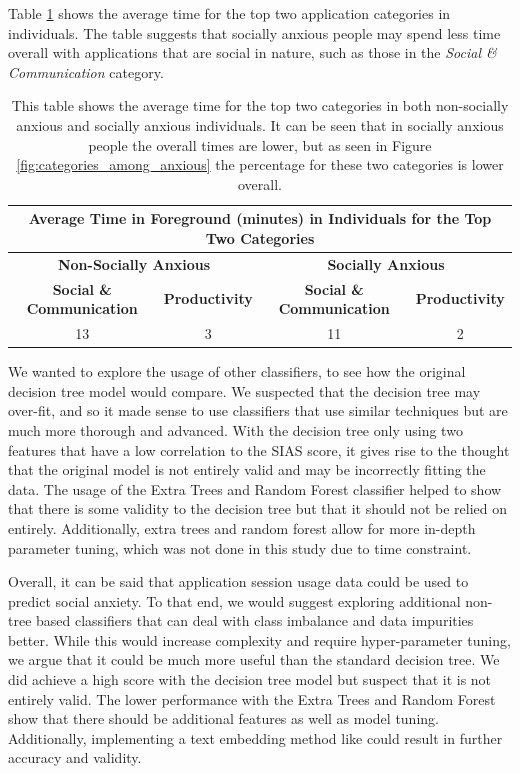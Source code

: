 \documentclass{l4proj}
\begin{document}
Table \ref{table:session_times_dtree} shows the average time for the top two application categories in individuals. The table suggests that socially anxious people may spend less time overall with applications that are social in nature, such as those in the \textit{Social \& Communication} category.

\begin{table}[htbp]
\centering
\begin{tabular}{@{}cccc@{}}
\toprule
\multicolumn{4}{c}{\textbf{Average Time in Foreground (minutes) in Individuals for the Top Two Categories}} \\ \midrule
\multicolumn{2}{c|}{\textbf{Non-Socially Anxious}} & \multicolumn{2}{c|}{\textbf{Socially Anxious}} \\ \midrule
\textbf{Social \& Communication} & \multicolumn{1}{c|}{\textbf{Productivity}} & \textbf{Social \& Communication} & \textbf{Productivity} \\
13 & \multicolumn{1}{c|}{3} & 11 & 2 \\ \bottomrule
\end{tabular}
\caption{This table shows the average time for the top two categories in both non-socially anxious and socially anxious individuals. It can be seen that in socially anxious people the overall times are lower, but as seen in Figure \ref{fig:categories_among_anxious} the percentage for these two categories is lower overall.}
\label{table:session_times_dtree}
\end{table}

We wanted to explore the usage of other classifiers, to see how the original decision tree model would compare. We suspected that the decision tree may over-fit, and so it made sense to use classifiers that use similar techniques but are much more thorough and advanced. With the decision tree only using two features that have a low correlation to the SIAS score, it gives rise to the thought that the original model is not entirely valid and may be incorrectly fitting the data. The usage of the Extra Trees and Random Forest classifier helped to show that there is some validity to the decision tree but that it should not be relied on entirely. Additionally, extra trees and random forest allow for more in-depth parameter tuning, which was not done in this study due to time constraint.

Overall, it can be said that application session usage data could be used to predict social anxiety. To that end, we would suggest exploring additional non-tree based classifiers that can deal with class imbalance and data impurities better. While this would increase complexity and require hyper-parameter tuning, we argue that it could be much more useful than the standard decision tree. We did achieve a high score with the decision tree model but suspect that it is not entirely valid. The lower performance with the Extra Trees and Random Forest show that there should be additional features as well as model tuning. Additionally, implementing a text embedding method like \cite{apple_patterns} could result in further accuracy and validity.
\end{document}
